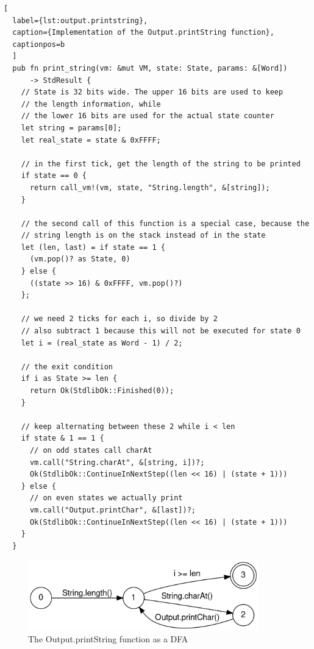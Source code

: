 \begin{lstlisting}[
  label={lst:output.printstring},
  caption={Implementation of the Output.printString function},
  captionpos=b
  ]
  pub fn print_string(vm: &mut VM, state: State, params: &[Word])
      -> StdResult {
    // State is 32 bits wide. The upper 16 bits are used to keep
    // the length information, while
    // the lower 16 bits are used for the actual state counter
    let string = params[0];
    let real_state = state & 0xFFFF;

    // in the first tick, get the length of the string to be printed
    if state == 0 {
      return call_vm!(vm, state, "String.length", &[string]);
    }

    // the second call of this function is a special case, because the
    // string length is on the stack instead of in the state
    let (len, last) = if state == 1 {
      (vm.pop()? as State, 0)
    } else {
      ((state >> 16) & 0xFFFF, vm.pop()?)
    };

    // we need 2 ticks for each i, so divide by 2
    // also subtract 1 because this will not be executed for state 0
    let i = (real_state as Word - 1) / 2;

    // the exit condition
    if i as State >= len {
      return Ok(StdlibOk::Finished(0));
    }

    // keep alternating between these 2 while i < len
    if state & 1 == 1 {
      // on odd states call charAt
      vm.call("String.charAt", &[string, i])?;
      Ok(StdlibOk::ContinueInNextStep((len << 16) | (state + 1)))
    } else {
      // on even states we actually print
      vm.call("Output.printChar", &[last])?;
      Ok(StdlibOk::ContinueInNextStep((len << 16) | (state + 1)))
    }
  }
\end{lstlisting}

\begin{center}
  \begin{figure}[ht]
    \centering
    \includegraphics[width=10cm]{fig/printString.png}
    \caption{The Output.printString function as a DFA}
    \label{fig:printstring-dfa}
  \end{figure}
\end{center}

